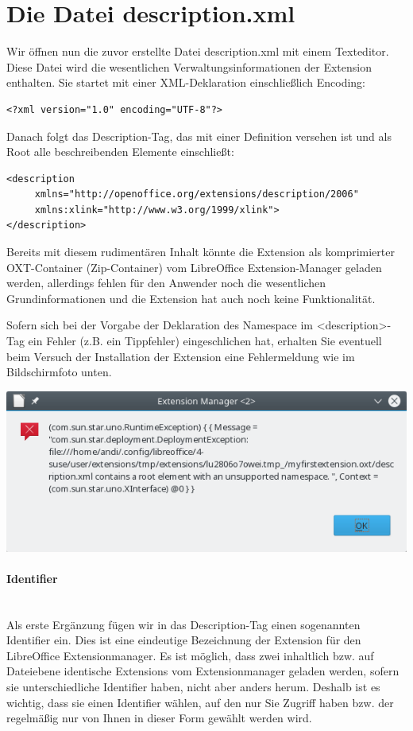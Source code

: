\documentclass[a4paper,10pt,pagesize,titlepage]{scrbook}
\begin{document}
\section{Die Datei description.xml}
Wir öffnen nun die zuvor erstellte Datei description.xml mit einem Texteditor. Diese Datei wird die wesentlichen Verwaltungsinformationen der Extension enthalten.
Sie startet mit einer XML-Deklaration einschließlich Encoding:
\begin{lstlisting}
<?xml version="1.0" encoding="UTF-8"?>
\end{lstlisting}
Danach folgt das Description-Tag, das mit einer Definition versehen ist und als Root alle beschreibenden Elemente einschließt:
\begin{lstlisting}
<description
     xmlns="http://openoffice.org/extensions/description/2006"
     xmlns:xlink="http://www.w3.org/1999/xlink">
</description>
\end{lstlisting}
Bereits mit diesem rudimentären Inhalt könnte die Extension als komprimierter OXT-Container (Zip-Container) vom LibreOffice Extension-Manager geladen werden, allerdings fehlen für den Anwender noch die wesentlichen Grundinformationen und die Extension hat auch noch keine Funktionalität.

Sofern sich bei der Vorgabe der Deklaration des Namespace im <description>-Tag ein Fehler (z.B. ein Tippfehler) eingeschlichen hat, erhalten Sie eventuell beim Versuch der Installation der Extension eine Fehlermeldung wie im Bildschirmfoto unten.
\begin{center}
	\captionsetup{type=figure}
\includegraphics[width=0.7\linewidth]{pics/error_wrong_namedeclaration}
\label{fig:error_wrong_namedeclaration}
\end{center}


\paragraph*{Identifier}$~~$\\

Als erste Ergänzung fügen wir in das Description-Tag einen sogenannten Identifier ein. Dies ist eine eindeutige Bezeichnung der Extension für den LibreOffice Extensionmanager. Es ist möglich, dass zwei inhaltlich bzw. auf Dateiebene identische Extensions vom Extensionmanager geladen werden, sofern sie unterschiedliche Identifier haben, nicht aber anders herum. Deshalb ist es wichtig, dass sie einen Identifier wählen, auf den nur Sie Zugriff haben bzw. der regelmäßig nur von Ihnen in dieser Form gewählt werden wird.
\end{document}
